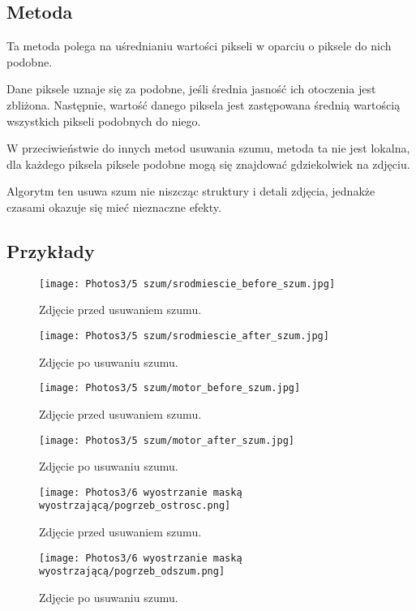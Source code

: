 \documentclass[]{mwart}
\begin{document}
\subsection{Metoda}
Ta metoda polega na uśrednianiu wartości pikseli w oparciu o piksele do nich podobne.

Dane piksele uznaje się za podobne, jeśli średnia jasność ich otoczenia
jest zbliżona. Następnie, wartość danego piksela jest zastępowana
średnią wartością wszystkich pikseli podobnych do niego.


W przeciwieństwie do innych metod usuwania szumu, metoda ta nie jest lokalna,
dla każdego piksela piksele podobne mogą się znajdować gdziekolwiek na zdjęciu.

Algorytm ten usuwa szum nie niszcząc struktury i detali zdjęcia, jednakże
czasami okazuje się mieć nieznaczne efekty. \newpage


\subsection{Przykłady}
\begin{figure}[H]
    \centering
    \texttt{[image: Photos3/5 szum/srodmiescie\_before\_szum.jpg]}
    \caption{Zdjęcie przed usuwaniem szumu.}
\end{figure}
\begin{figure}[H]
    \centering
    \texttt{[image: Photos3/5 szum/srodmiescie\_after\_szum.jpg]}
    \caption{Zdjęcie po usuwaniu szumu.}
\end{figure} \newpage

\begin{figure}[H]
    \centering
    \texttt{[image: Photos3/5 szum/motor\_before\_szum.jpg]}
    \caption{Zdjęcie przed usuwaniem szumu.}
\end{figure}
\begin{figure}[H]
    \centering
    \texttt{[image: Photos3/5 szum/motor\_after\_szum.jpg]}
    \caption{Zdjęcie po usuwaniu szumu.}
\end{figure}

\begin{figure}[H]
    \centering
    \texttt{[image: Photos3/6 wyostrzanie maską wyostrzającą/pogrzeb\_ostrosc.png]}
    \caption{Zdjęcie przed usuwaniem szumu.}
\end{figure}
\begin{figure}[H]
    \centering
    \texttt{[image: Photos3/6 wyostrzanie maską wyostrzającą/pogrzeb\_odszum.png]}
    \caption{Zdjęcie po usuwaniu szumu.}
\end{figure}
\end{document}
